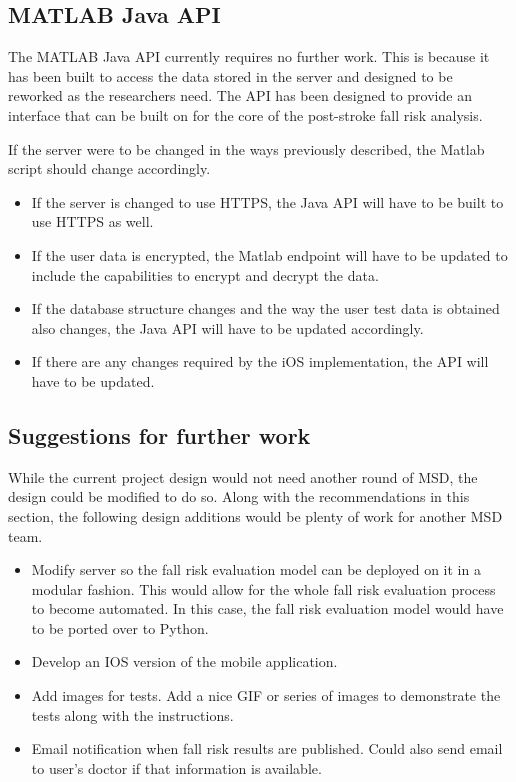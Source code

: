 \documentclass[conference]{IEEEtran}
\begin{document}
\subsection{MATLAB Java API}

The MATLAB Java API currently requires no further work. This is because it has been built to access the data stored in the server and designed to be reworked as the researchers need. The API has been designed to provide an interface that can be built on for the core of the post-stroke fall risk analysis.

If the server were to be changed in the ways previously described, the Matlab script should change accordingly.

\begin{itemize}
    \item If the server is changed to use HTTPS, the Java API will have to be built to use HTTPS as well.
    \item If the user data is encrypted, the Matlab endpoint will have to be updated to include the capabilities to encrypt and decrypt the data.
    \item If the database structure changes and the way the user test data is obtained also changes, the Java API will have to be updated accordingly. 
    \item If there are any changes required by the iOS implementation, the API will have to be updated. 
\end{itemize}

\subsection{Suggestions for further work}

While the current project design would not need another round of MSD, the design could be modified to do so. Along with the recommendations in this section, the following design additions would be plenty of work for another MSD team.

\begin{itemize}
    \item Modify server so the fall risk evaluation model can be deployed on it in a modular fashion. This would allow for the whole fall risk evaluation process to become automated. In this case, the fall risk evaluation model would have to be ported over to Python.
    \item Develop an IOS version of the mobile application.
    \item Add images for tests. Add a nice GIF or series of images to demonstrate the tests along with the instructions.
    \item Email notification when fall risk results are published. Could also send email to user's doctor if that information is available.
\end{itemize}
\end{document}
